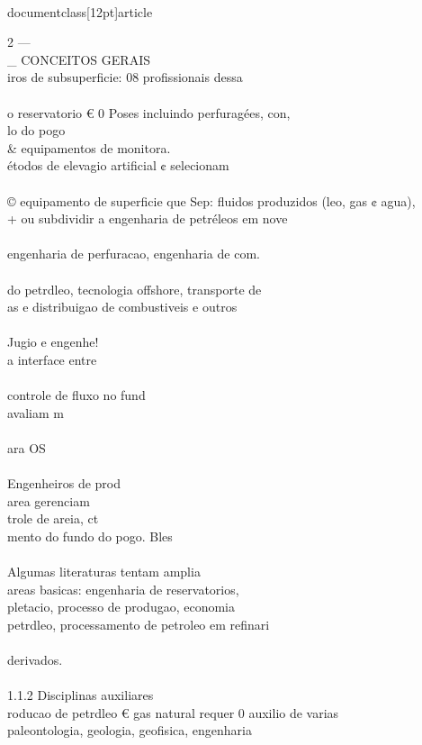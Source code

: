 \\documentclass[12pt]{article}
\begin{document}
{2 —\\_ CONCEITOS GERAIS\\
iros de subsuperficie: 08 profissionais dessa\\
\\
o reservatorio € 0 Poses incluindo perfuragées, con,\\
lo do pogo \\& equipamentos de monitora.\\
étodos de elevagio artificial ¢ selecionam\\
\\
© equipamento de superficie que Sep: fluidos produzidos (leo, gas ¢ agua),\\
+ ou subdividir a engenharia de petréleos em nove\\
\\
engenharia de perfuracao, engenharia de com.\\
\\
do petrdleo, tecnologia offshore, transporte de\\
as e distribuigao de combustiveis e outros\\
\\
Jugio e engenhe!\\
a interface entre\\
\\
controle de fluxo no fund\\
avaliam m\\
\\
ara OS\\
\\
Engenheiros de prod\\
area gerenciam\\
trole de areia, ct\\
mento do fundo do pogo. Bles\\
\\
Algumas literaturas tentam amplia\\
areas basicas: engenharia de reservatorios,\\
pletacio, processo de produgao, economia\\
petrdleo, processamento de petroleo em refinari\\
\\
derivados.\\
\\
1.1.2 Disciplinas auxiliares\\
roducao de petrdleo € gas natural requer 0 auxilio de varias\\
paleontologia, geologia, geofisica, engenharia\\
}
\end{document}
